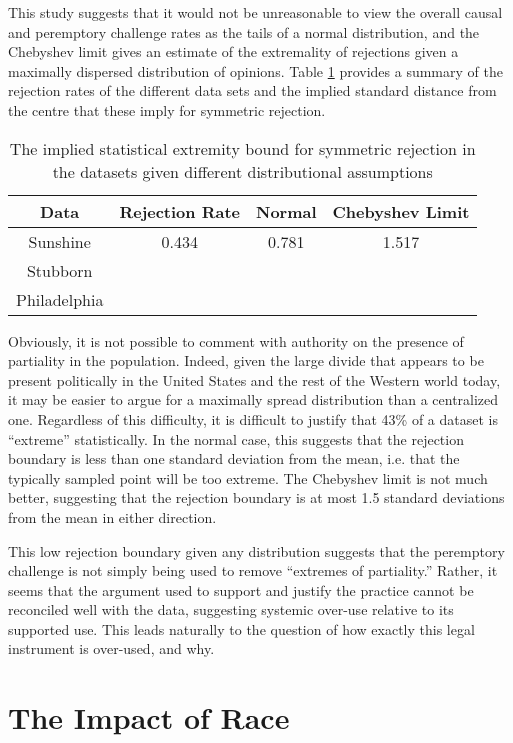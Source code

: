 This study suggests that it would not be unreasonable to view the overall causal and peremptory challenge rates as the tails of a
normal distribution, and the Chebyshev limit gives an estimate of the extremality of rejections given a maximally dispersed
distribution of opinions. Table \ref{tab:rejbounds} provides a summary of the rejection rates of the different data sets and the
implied standard distance from the centre that these imply for symmetric rejection.

\begin{table}
  \centering
  \caption[Implied Rejection Boundaries]{The implied statistical extremity bound for symmetric rejection in the datasets given
    different distributional assumptions} \label{tab:rejbounds}
  \begin{tabular}{|c|c|c|c|} \hline
    Data & Rejection Rate & Normal & Chebyshev Limit \\ \hline
    Sunshine & 0.434 & 0.781 & 1.517 \\
    Stubborn & & & \\
    Philadelphia & & & \\
    \hline
  \end{tabular}
\end{table}

Obviously, it is not possible to comment with authority on the presence of partiality in the population. Indeed, given the large
divide that appears to be present politically in the United States and the rest of the Western world today, it may be easier to
argue for a maximally spread distribution than a centralized one. Regardless of this difficulty, it is difficult to justify that
43\% of a dataset is ``extreme'' statistically. In the normal case, this suggests that the rejection boundary is less than one
standard deviation from the mean, i.e. that the typically sampled point will be too extreme. The Chebyshev limit is not much
better, suggesting that the rejection boundary is at most 1.5 standard deviations from the mean in either direction.

This low rejection boundary given any distribution suggests that the peremptory challenge is not simply being used to remove
``extremes of partiality.'' Rather, it seems that the argument used to support and justify the practice cannot be reconciled well
with the data, suggesting systemic over-use relative to its supported use. This leads naturally to the question of how exactly
this legal instrument is over-used, and why.

\section{The Impact of Race} \label{sec:impactrace}

